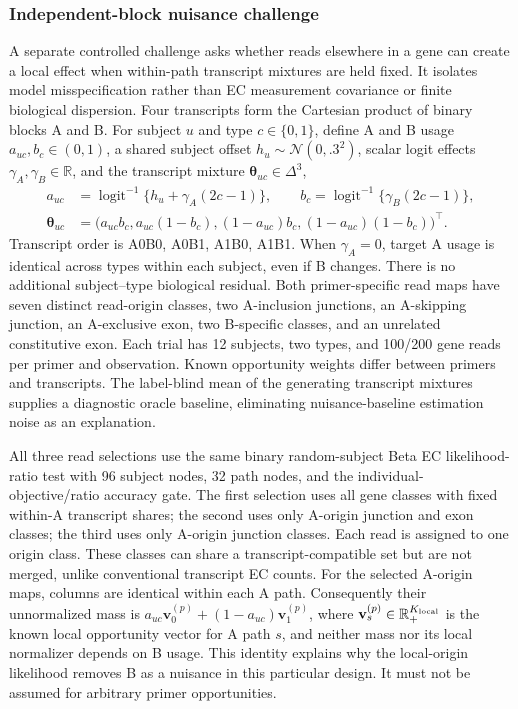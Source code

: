 \documentclass[11pt]{article}
\begin{document}
\subsubsection*{Independent-block nuisance challenge}

A separate controlled challenge asks whether reads elsewhere in a gene can create a local effect when within-path transcript mixtures are held fixed. It isolates model misspecification rather than EC measurement covariance or finite biological dispersion. Four transcripts form the Cartesian product of binary blocks A and B. For subject \(u\) and type \(c\in\{0,1\}\), define A and B usage \(a_{uc},b_c\in(0,1)\), a shared subject offset \(h_u\sim\mathcal N(0,.3^2)\), scalar logit effects \(\gamma_A,\gamma_B\in\mathbb R\), and the transcript mixture \(\boldsymbol\theta_{uc}\in\Delta^3\), \begin{equation}\begin{aligned}a_{uc}&=\operatorname{logit}^{-1}\{h_u+\gamma_A(2c-1)\},\qquad b_c=\operatorname{logit}^{-1}\{\gamma_B(2c-1)\},\\ \boldsymbol\theta_{uc}&=\bigl(a_{uc}b_c,a_{uc}(1-b_c),(1-a_{uc})b_c,(1-a_{uc})(1-b_c)\bigr)^\top.\end{aligned}\end{equation} Transcript order is A0B0, A0B1, A1B0, A1B1. When \(\gamma_A=0\), target A usage is identical across types within each subject, even if B changes. There is no additional subject--type biological residual. Both primer-specific read maps have seven distinct read-origin classes, two A-inclusion junctions, an A-skipping junction, an A-exclusive exon, two B-specific classes, and an unrelated constitutive exon. Each trial has 12 subjects, two types, and 100/200 gene reads per primer and observation. Known opportunity weights differ between primers and transcripts. The label-blind mean of the generating transcript mixtures supplies a diagnostic oracle baseline, eliminating nuisance-baseline estimation noise as an explanation.

All three read selections use the same binary random-subject Beta EC likelihood-ratio test with 96 subject nodes, 32 path nodes, and the individual-objective/ratio accuracy gate. The first selection uses all gene classes with fixed within-A transcript shares; the second uses only A-origin junction and exon classes; the third uses only A-origin junction classes. Each read is assigned to one origin class. These classes can share a transcript-compatible set but are not merged, unlike conventional transcript EC counts. For the selected A-origin maps, columns are identical within each A path. Consequently their unnormalized mass is \(a_{uc}\mathbf v_0^{(p)}+(1-a_{uc})\mathbf v_1^{(p)}\), where \(\mathbf v_s^{(p)}\in\mathbb R_+^{K_{\rm local}}\) is the known local opportunity vector for A path \(s\), and neither mass nor its local normalizer depends on B usage. This identity explains why the local-origin likelihood removes B as a nuisance in this particular design. It must not be assumed for arbitrary primer opportunities.
\end{document}
